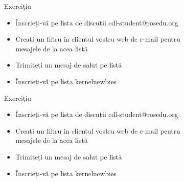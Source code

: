 \documentclass{beamer}
\begin{document}
    \begin{frame}{Exercițiu}
    \begin{itemize}
    \setlength{\itemsep}{0.5cm}
    \item Înscrieți-vă pe lista de discuții cdl-student@rosedu.org
    \item Creați un filtru în clientul vostru web de e-mail pentru \\
        mesajele de la acea listă
    \item Trimiteți un mesaj de salut pe listă
    \item Înscrieți-vă pe lista kernelnewbies
    \end{itemize}
    \end{frame}
    \begin{frame}{Exercițiu}
    \begin{itemize}
    \setlength{\itemsep}{0.5cm}
    \item Înscrieți-vă pe lista de discuții cdl-student@rosedu.org
    \item Creați un filtru în clientul vostru web de e-mail pentru \\
        mesajele de la acea listă
    \item Trimiteți un mesaj de salut pe listă
    \item Înscrieți-vă pe lista kernelnewbies
    \end{itemize}
    \end{frame}
    
\end{document}
